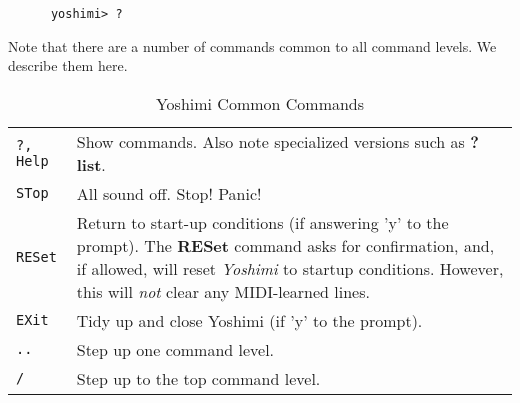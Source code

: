    \begin{verbatim}
      yoshimi> ?
   \end{verbatim}

   Note that there are a number of commands common to all command levels.
   We describe them here.


\begin{center}
\begin{longtable}{p{2cm} p{10cm}}
\caption[Yoshimi Common Commands]{Yoshimi Common Commands} \\

\texttt{?,  Help} &
   Show commands.  Also note specialized versions such as \textbf{? list}. \\
\texttt{STop} &
   All sound off.  Stop!  Panic! \\
\texttt{RESet} &
   Return to start-up conditions (if answering 'y' to the prompt).
   The \textbf{RESet} command asks for confirmation, and, if allowed, will
   reset \textsl{Yoshimi} to startup conditions.
   However, this will \textsl{not} clear any MIDI-learned lines. \\
\texttt{EXit} &
   Tidy up and close Yoshimi (if 'y' to the prompt). \\
\texttt{..} &
   Step up one command level. \\
\texttt{/} &
   Step up to the top command level. \\

\end{longtable}
\end{center}




